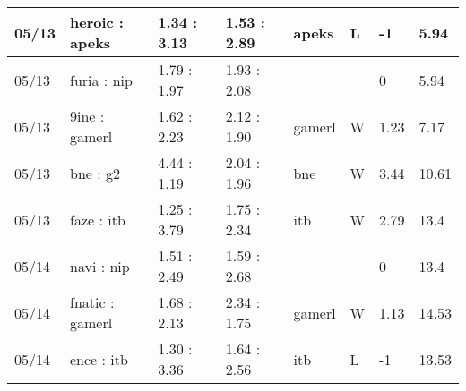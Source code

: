 \begin{small}
\begin{longtable}{|l|l|l|l|l|l|l|l|}
	05/13                               & heroic : apeks                      & 1.34 : 3.13                             & 1.53 : 2.89                             & apeks                             & L                                 & -1                                   & 5.94                              \\ \hline
	05/13                               & furia : nip                         & 1.79 : 1.97                             & 1.93 : 2.08                             &                                   &                                   & 0                                    & 5.94                              \\ \hline
	05/13                               & 9ine : gamerl                       & 1.62 : 2.23                             & 2.12 : 1.90                             & gamerl                            & W                                 & 1.23                                 & 7.17                              \\ \hline
	05/13                               & bne : g2                            & 4.44 : 1.19                             & 2.04 : 1.96                             & bne                               & W                                 & 3.44                                 & 10.61                             \\ \hline
	05/13                               & faze : itb                          & 1.25 : 3.79                             & 1.75 : 2.34                             & itb                               & W                                 & 2.79                                 & 13.4                              \\ \hline
	05/14                               & navi : nip                          & 1.51 : 2.49                             & 1.59 : 2.68                             &                                   &                                   & 0                                    & 13.4                              \\ \hline
	05/14                               & fnatic : gamerl                     & 1.68 : 2.13                             & 2.34 : 1.75                             & gamerl                            & W                                 & 1.13                                 & 14.53                             \\ \hline
	05/14                               & ence : itb                          & 1.30 : 3.36                             & 1.64 : 2.56                             & itb                               & L                                 & -1                                   & 13.53                             \\ \hline

\end{longtable}
\end{small}
